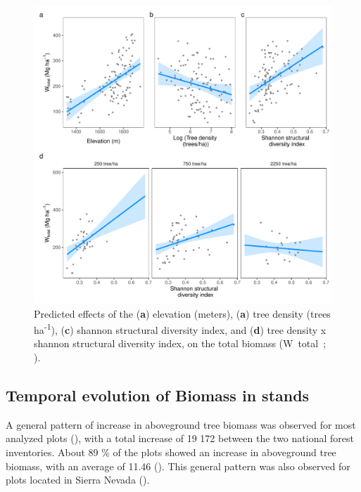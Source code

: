 \begin{figure}
    \centering
    \includegraphics[width=\textwidth]{img/carbon/carbon-glm-effects.pdf}
    \caption{Predicted effects of the (\textbf{a}) elevation (meters), (\textbf{a}) tree density (trees ha\textsuperscript{-1}), (\textbf{c}) shannon structural diversity index, and (\textbf{d}) tree density x shannon structural diversity index, on the total biomass (W~total~; \mgha).}
    \label{fig:carbon:glm}
\end{figure}


\subsection{Temporal evolution of Biomass in \Qp stands}\label{sec:carbon:results-temporal}
A general pattern of increase in aboveground tree biomass was observed for most analyzed plots (), with a total increase of 19 172 \mgha between the two national forest inventories. About 89 \% of the plots showed an increase in aboveground tree biomass, with an average of 11.46 \mgha (). This general pattern was also observed for plots located in Sierra Nevada ().

